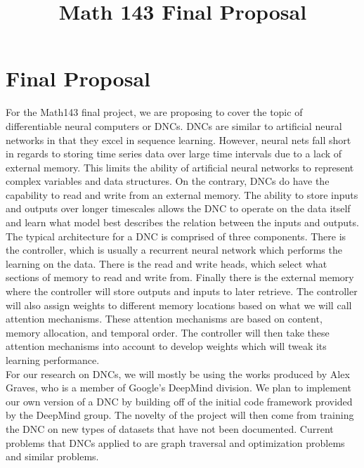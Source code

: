 \documentclass[11pt,letterpaper,cm]{hmcpset}
\title{Math 143 Final Proposal}
\begin{document}
\section{Final Proposal}
For the Math143 final project, we are proposing to cover the topic of differentiable neural computers or DNCs.
DNCs are similar to artificial neural networks in that they excel in sequence learning. 
However, neural nets fall short in regards to storing time series data over large time intervals due to a lack of external memory. 
This limits the ability of artificial neural networks to represent complex variables and data structures. 
On the contrary, DNCs do have the capability to read and write from an external memory.
The ability to store inputs and outputs over longer timescales allows the DNC to operate on the data itself and learn what model best describes the relation between the inputs and outputs.
The typical architecture for a DNC is comprised of three components.
There is the controller, which is usually a recurrent neural network which performs the learning on the data.
There is the read and write heads, which select what sections of memory to read and write from.
Finally there is the external memory where the controller will store outputs and inputs to later retrieve.
The controller will also assign weights to different memory locations based on what we will call attention mechanisms. 
These attention mechanisms are based on content, memory allocation, and temporal order.
The controller will then take these attention mechanisms into account to develop weights which will tweak its learning performance.
\\
\indent For our research on DNCs, we will mostly be using the works produced by Alex Graves, who is a member of Google's DeepMind division.
We plan to implement our own version of a DNC by building off of the initial code framework provided by the DeepMind group.
The novelty of the project will then come from training the DNC on new types of datasets that have not been documented. 
Current problems that DNCs applied to are graph traversal and optimization problems and similar problems.
\end{document}
